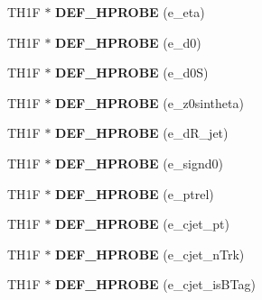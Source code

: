 \begin{DoxyCompactItemize}
\item 
\hypertarget{classHistos__Fake_a23fed18816c96dc5d2ced05b3a9f86a8}{
TH1F $\ast$ {\bfseries DEF\_\-HPROBE} (e\_\-eta)}
\label{classHistos__Fake_a23fed18816c96dc5d2ced05b3a9f86a8}

\item 
\hypertarget{classHistos__Fake_a13ce49b2c3782bf0d178168d33c3d029}{
TH1F $\ast$ {\bfseries DEF\_\-HPROBE} (e\_\-d0)}
\label{classHistos__Fake_a13ce49b2c3782bf0d178168d33c3d029}

\item 
\hypertarget{classHistos__Fake_a8f48bc75c2c348791842fd70c95afe2d}{
TH1F $\ast$ {\bfseries DEF\_\-HPROBE} (e\_\-d0S)}
\label{classHistos__Fake_a8f48bc75c2c348791842fd70c95afe2d}

\item 
\hypertarget{classHistos__Fake_a27988be0d964247480292ae479db41d5}{
TH1F $\ast$ {\bfseries DEF\_\-HPROBE} (e\_\-z0sintheta)}
\label{classHistos__Fake_a27988be0d964247480292ae479db41d5}

\item 
\hypertarget{classHistos__Fake_aad046f9bcbc702e0a6a9307a19e66f5b}{
TH1F $\ast$ {\bfseries DEF\_\-HPROBE} (e\_\-dR\_\-jet)}
\label{classHistos__Fake_aad046f9bcbc702e0a6a9307a19e66f5b}

\item 
\hypertarget{classHistos__Fake_a2834ca444300d06b9b8575d7bb3ce8f8}{
TH1F $\ast$ {\bfseries DEF\_\-HPROBE} (e\_\-signd0)}
\label{classHistos__Fake_a2834ca444300d06b9b8575d7bb3ce8f8}

\item 
\hypertarget{classHistos__Fake_a7783a229871d5eb8e293fe5df3498078}{
TH1F $\ast$ {\bfseries DEF\_\-HPROBE} (e\_\-ptrel)}
\label{classHistos__Fake_a7783a229871d5eb8e293fe5df3498078}

\item 
\hypertarget{classHistos__Fake_a5cfd00a0889456940096ed63548b4ecd}{
TH1F $\ast$ {\bfseries DEF\_\-HPROBE} (e\_\-cjet\_\-pt)}
\label{classHistos__Fake_a5cfd00a0889456940096ed63548b4ecd}

\item 
\hypertarget{classHistos__Fake_a0dfaa9af3cc4189b5072d8f8b1826cfe}{
TH1F $\ast$ {\bfseries DEF\_\-HPROBE} (e\_\-cjet\_\-nTrk)}
\label{classHistos__Fake_a0dfaa9af3cc4189b5072d8f8b1826cfe}

\item 
\hypertarget{classHistos__Fake_aef6d11975589298af93c8d64619381aa}{
TH1F $\ast$ {\bfseries DEF\_\-HPROBE} (e\_\-cjet\_\-isBTag)}
\label{classHistos__Fake_aef6d11975589298af93c8d64619381aa}


\end{DoxyCompactItemize}
